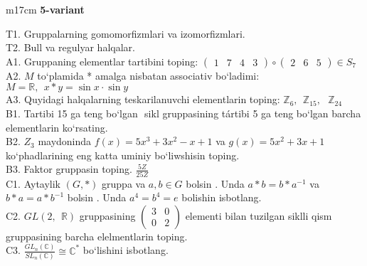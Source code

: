 \documentclass{article}
\begin{document}
\begin{tabular}{m{17cm}}
\textbf{5-variant}
\newline

T1. Gruppalarning gomomorfizmlari va izomorfizmlari. \\
T2. Bull va regulyar halqalar. \\
A1. Gruppaning elementlar tartibini toping: \(\begin{pmatrix}
1 & 7 & 4 & 3
\end{pmatrix} \circ \begin{pmatrix}
2 & 6 & 5
\end{pmatrix} \in S_{7}\) \\
A2. \(M\) to`plamida * amalga nisbatan associativ bo`ladimi: \(M\mathbb{= R},\ \ x*y = \sin x \cdot \sin y\) \\
A3. Quyidagi halqalarning teskarilanuvchi elementlarin toping: \(\mathbb{Z}_{6},\ \ \mathbb{Z}_{15},\ \ \ \mathbb{Z}_{24}\) \\
B1. Tartibi 15 ga teng bo`lgan \(< a >\) sikl gruppasining tártibi 5 ga teng bo`lgan barcha elementlarin ko`rsating. \\
B2. \(Z_{3}\) maydoninda \(f(x) = 5x^{3} + 3x^{2} - x + 1\) va \(g(x) = 5x^{2} + 3x + 1\) ko`phadlarining eng katta uminiy bo`liwshisin toping. \\
B3. Faktor gruppasin toping. \(\frac{5Z}{25Z}\) \\
C1. Aytaylik \((G,*)\) gruppa va \(a,b \in G\) bo\textquotesingle lsin . Unda \(a*b = b*a^{- 1}\) va \(b*a = a*b^{- 1}\) bo\textquotesingle lsin . Unda \(a^{4} = b^{4} = e\) bolishin isbotlang. \\
C2. \(GL(2,\mathbb{\ \ R})\) gruppasining \(\begin{pmatrix}
3 & 0 \\
0 & 2
\end{pmatrix}\) elementi bilan tuzilgan siklli qism gruppasining barcha elelmentlarin toping. \\
C3. \(\frac{GL_{n}(\mathbb{C})}{SL_{n}(\mathbb{C})} \cong \mathbb{C}^{*}\) bo`lishini isbotlang.
 \\

\end{tabular}
\vspace{1cm}
\end{document}
